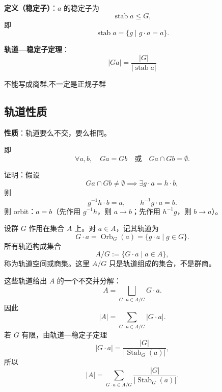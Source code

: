 \documentclass[12pt, a4paper]{article}
\begin{document}
\textbf{定义（稳定子）}：\(a\) 的稳定子为
\[
\operatorname{stab} a \le G,
\]
即
\[
\operatorname{stab} a = \{g \mid g \cdot a = a\}.
\]

\textbf{轨道—稳定子定理}：
\[
|Ga| = \frac{|G|}{|\operatorname{stab} a|}
\]

不能写成商群,不一定是正规子群

\subsection*{轨道性质}

\textbf{性质}：轨道要么不交，要么相同。

即
\[
\forall a, b, \quad Ga = Gb \quad \text{或} \quad Ga \cap Gb = \emptyset.
\]

证明：假设
\[
Ga \cap Gb \neq \emptyset \implies \exists g \cdot a = h \cdot b,
\]
则
\[
g^{-1} h \cdot b = a, \qquad h^{-1} g \cdot a = b.
\]
则 orbit：\(a = b\)（先作用 \(g^{-1}h\)，则 \(a \to b\)；先作用 \(h^{-1}g\)，则 \(b \to a\)）。

设群 \(G\) 作用在集合 \(A\) 上。对 \(a\in A\)，记其轨道为
\[
G\cdot a=\operatorname{Orb}_G(a)=\{g\cdot a\mid g\in G\}.
\]
所有轨道构成集合
\[
A/G:=\{G\cdot a\mid a\in A\},
\]
称为轨道空间或商集。这里 \(A/G\) 只是轨道组成的集合，不是群商。

这些轨道给出 \(A\) 的一个不交并分解：
\[
A=\bigsqcup_{G\cdot a\in A/G} G\cdot a.
\]
因此
\[
|A|=\sum_{G\cdot a\in A/G}|G\cdot a|.
\]
若 \(G\) 有限，由轨道—稳定子定理
\[
|G\cdot a|=\frac{|G|}{|\operatorname{Stab}_G(a)|},
\]
所以
\[
|A|
=
\sum_{G\cdot a\in A/G}
\frac{|G|}{|\operatorname{Stab}_G(a)|}.
\]
\end{document}
